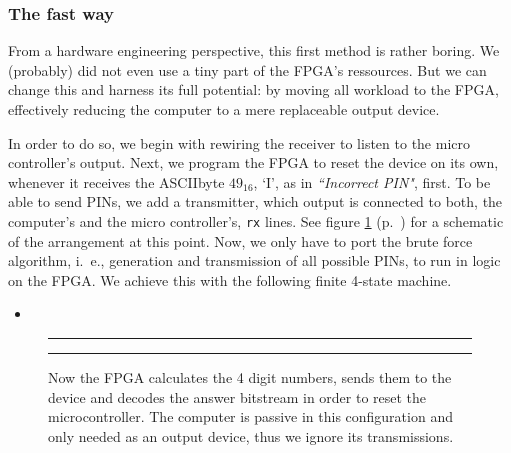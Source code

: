 \subsubsection*{The fast way}
From a hardware engineering perspective, this first method is rather boring. We (probably) did not even use a tiny part of the FPGA's ressources. 
But we can change this and harness its full potential: by moving all workload to the FPGA, effectively reducing the computer to a mere replaceable output device. 

In order to do so, we begin with rewiring the receiver to listen to the micro controller's output.
Next, we program the FPGA to reset the device on its own, whenever it receives the ASCIIbyte $49_{16}$, `I', as in \textit{``Incorrect PIN"}, first. 
To be able to send PINs, we add a transmitter, which output is connected to both, the computer's and the micro controller's, \texttt{rx} lines. 
See figure \ref{fig:as4-schematic-2} (p.~\pageref{fig:as4-schematic-2}) for a schematic of the arrangement at this point.
Now, we only have to port the brute force algorithm, i.~e., generation and transmission of all possible PINs, to run in logic on the FPGA. We achieve this with the following finite 4-state machine.

\begin{itemize}
    \item[] 
\end{itemize}

\begin{figure}[h]
    \begin{center}
    	\hrule\vspace{1em}
        
        \caption{Now the FPGA calculates the 4 digit numbers, sends them to the device and decodes the answer bitstream in order to reset the microcontroller. The computer is passive in this configuration and only needed as an output device, thus we ignore its transmissions.}
        \label{fig:as4-schematic-2}
        \vspace{1em}\hrule
    \end{center}
\end{figure}

